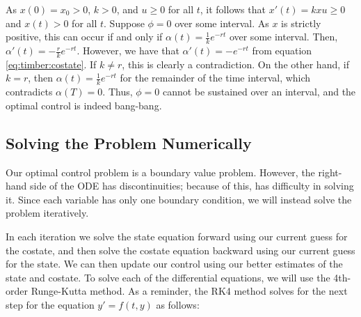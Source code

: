 As $x(0) = x_{0} > 0$, $k > 0$, and $u \geq 0$ for all $t$, it follows that $x'(t) = kxu \geq 0$ and $x(t) > 0$ for all $t$. 
Suppose $\phi = 0$ over some interval. 
As $x$ is strictly positive, this can occur if and only if $\alpha(t) = \frac{1}{k}e^{-rt}$ over some interval. Then, $\alpha '(t) = -\frac{r}{k}e^{-rt}$. 
However, we have that $\alpha '(t) = -e^{-rt}$ from equation \eqref{eq:timber:costate}. 
If $k \neq r$, this is clearly a contradiction. 
On the other hand, if $k = r$, then $\alpha(t) = \frac{1}{k}e^{-rt}$ for the remainder of the time interval, which contradicts $\alpha(T) = 0$. %
Thus, $\phi = 0$ cannot be sustained over an interval, and the optimal control is indeed bang-bang.

\subsection*{Solving the Problem Numerically}
Our optimal control problem is a boundary value problem.
However, the right-hand side of the ODE has discontinuities; because of this,  has difficulty in solving it.
Since each variable has only one boundary condition, we will instead solve the problem iteratively.

In each iteration we solve the state equation forward using our current guess for the costate, and then solve the costate equation backward using our current guess for the state.
We can then update our control using our better estimates of the state and costate. 
To solve each of the differential equations, we will use the 4th-order Runge-Kutta method.
As a reminder, the RK4 method solves for the next step for the equation \(y'=f(t,y)\) as follows:

